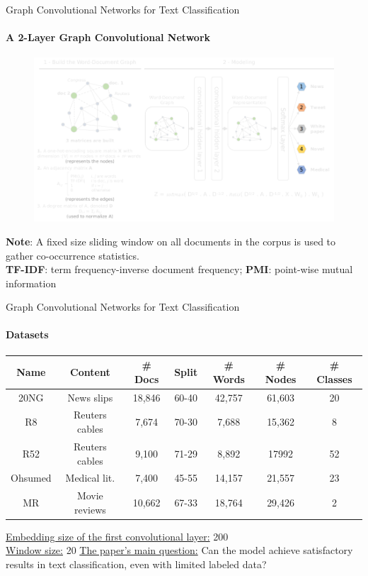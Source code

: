 \documentclass{beamer}
\begin{document}
\begin{darkframes}
    \begin{frame}[label=lists]{\large{Graph Convolutional Networks for Text Classification}}
        \framesubtitle{A 2-Layer Graph Convolutional Network}
        \begin{figure}[h!]
          \centering
          \includegraphics[width=\textwidth]{fibeamer/logo/zut/model.png}
        \end{figure}
        \raggedright\tiny{\textbf{Note}: A fixed size sliding window on all documents in the corpus is used to gather co-occurrence statistics.\\
        \textbf{TF-IDF}: term frequency-inverse document frequency; \textbf{PMI}: point-wise mutual information}
    \end{frame}
    
    \begin{frame}[label=lists]{\large{Graph Convolutional Networks for Text Classification}}
        \framesubtitle{Datasets}
        \footnotesize{\begin{center}
        \begin{tabular}{ c c c c c c c }
         Name & Content & \# Docs & Split & \# Words & \# Nodes & \# Classes  \\ 
         \hline
         20NG & News slips & 18,846 & 60-40 & 42,757 & 61,603 & 20 \\  
         R8 & Reuters cables & 7,674 & 70-30 & 7,688 & 15,362 & 8 \\ 
         R52 & Reuters cables & 9,100 & 71-29 & 8,892 & 17992 & 52 \\ 
         Ohsumed & Medical lit. & 7,400 & 45-55 & 14,157 & 21,557 & 23 \\ 
         MR & Movie reviews & 10,662 & 67-33 & 18,764 & 29,426 & 2
        \end{tabular}
        \end{center}}
        \clearpage
        \underline{Embedding size of the first convolutional layer:} 200
        \\\underline{Window size:} 20
        \clearpage
        \underline{The paper's main question:} 
        \clearpage
        \centering Can the model achieve satisfactory results in text classification, even with limited labeled data?
        \clearpage
    \end{frame}
    

\end{darkframes}
\end{document}
